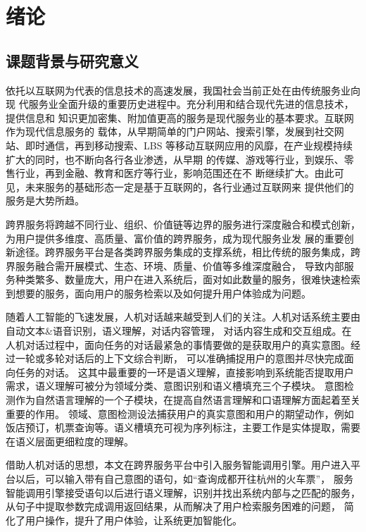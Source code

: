 \chapter{绪论}

\section{课题背景与研究意义}

依托以互联网为代表的信息技术的高速发展，我国社会当前正处在由传统服务业向现
代服务业全面升级的重要历史进程中。充分利用和结合现代先进的信息技术，提供信息和
知识更加密集、附加值更高的服务是现代服务业的基本要求。互联网作为现代信息服务的
载体，从早期简单的门户网站、搜索引擎，发展到社交网站、即时通信，再到移动搜索、LBS
等移动互联网应用的风靡，在产业规模持续扩大的同时，也不断向各行各业渗透，从早期
的传媒、游戏等行业，到娱乐、零售行业，再到金融、教育和医疗等行业，影响范围还在不
断继续扩大\cite{王晓玲2015我国现代服务业借力}。由此可见，未来服务的基础形态一定是基于互联网的，各行业通过互联网来
提供他们的服务是大势所趋。

跨界服务将跨越不同行业、组织、价值链等边界的服务进行深度融合和模式创新，为用户提供多维度、高质量、富价值的跨界服务，成为现代服务业发
展的重要创新途径。跨界服务平台是各类跨界服务集成的支撑系统，相比传统的服务集成，跨界服务融合需开展模式、生态、环境、质量、价值等多维深度融合，
导致内部服务种类繁多、数量庞大，用户在进入系统后，面对如此数量的服务，很难快速检索到想要的服务，面向用户的服务检索以及如何提升用户体验成为问题。

随着人工智能的飞速发展，人机对话越来越受到人们的关注。人机对话系统主要由自动文本\&语音识别，语义理解，对话内容管理，
对话内容生成和交互组成。在人机对话过程中，面向任务的对话最紧急的事情要做的是获取用户的真实意图。经过一轮或多轮对话后的上下文综合判断，
可以准确捕捉用户的意图并尽快完成面向任务的对话。
这其中最重要的一环是语义理解，直接影响到系统能否提取用户需求，语义理解可被分为领域分类、意图识别和语义槽填充三个子模块。
意图检测作为自然语言理解的一个子模块，在提高自然语言理解和口语理解方面起着至关重要的作用。
领域、意图检测设法捕获用户的真实意图和用户的期望动作，例如饭店预订，机票查询等。语义槽填充可视为序列标注，主要工作是实体提取，需要在语义层面更细粒度的理解。

借助人机对话的思想，本文在跨界服务平台中引入服务智能调用引擎。用户进入平台以后，可以输入带有自己意图的语句，如“查询成都开往杭州的火车票”，
服务智能调用引擎接受语句以后进行语义理解，识别并找出系统内部与之匹配的服务，从句子中提取参数完成调用返回结果，从而解决了用户检索服务困难的问题，
简化了用户操作，提升了用户体验，让系统更加智能化。


